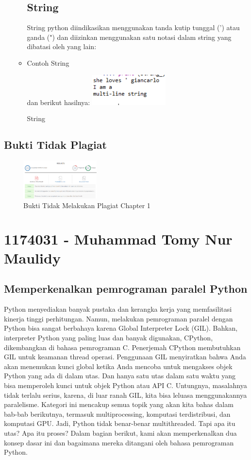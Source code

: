 \begin{enumerate}
\begin{itemize}
\subsection{String}
	\hfill\break
	String python diindikasikan menggunakan tanda kutip tunggal (') atau ganda (") dan diizinkan menggunakan satu notasi dalam string yang dibatasi oleh yang lain:
		\item Contoh String
		\hfill\break
	           
		\hfill\break
		dan berikut hasilnya:
		\includegraphics[width=4cm]{figures/kelompok1/1/anam/string.png}
		\centering
		\caption{String}
	\end{itemize}
\end{enumerate}
\subsection{Bukti Tidak Plagiat}
\begin{figure}[H]
	\includegraphics[width=4cm]{figures/kelompok1/1/anam/plagiat_anam.png}
	\centering
	\caption{Bukti Tidak Melakukan Plagiat Chapter 1}
\end{figure}
\section{1174031 - Muhammad Tomy Nur Maulidy}
\subsection{Memperkenalkan pemrograman paralel Python}
	Python menyediakan banyak pustaka dan kerangka kerja yang memfasilitasi kinerja tinggi
perhitungan. Namun, melakukan pemrograman paralel dengan Python bisa sangat berbahaya
karena Global Interpreter Lock (GIL).
Bahkan, interpreter Python yang paling luas dan banyak digunakan, CPython, dikembangkan di
bahasa pemrograman C. Penerjemah CPython membutuhkan GIL untuk keamanan thread
operasi. Penggunaan GIL menyiratkan bahwa Anda akan menemukan kunci global ketika Anda mencoba
untuk mengakses objek Python yang ada di dalam utas. Dan hanya satu utas dalam satu waktu yang bisa
memperoleh kunci untuk objek Python atau API C.
Untungnya, masalahnya tidak terlalu serius, karena, di luar ranah GIL, kita bisa leluasa menggunakannya
paralelisme. Kategori ini mencakup semua topik yang akan kita bahas dalam bab-bab berikutnya,
termasuk multiprocessing, komputasi terdistribusi, dan komputasi GPU.
Jadi, Python tidak benar-benar multithreaded. Tapi apa itu utas? Apa itu proses? Dalam
bagian berikut, kami akan memperkenalkan dua konsep dasar ini dan bagaimana mereka
ditangani oleh bahasa pemrograman Python.
